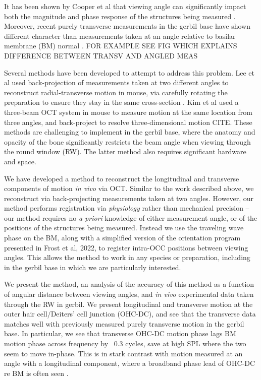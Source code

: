 \documentclass[preprint,NumberedRefs]{JASA}
\begin{document}
\par{It has been shown by Cooper et al that viewing angle can significantly impact both the magnitude and phase response of the structures being measured \citep{cooper2018}. Moreover, recent purely transverse measurements in the gerbil base have shown different character than measurements taken at an angle relative to basilar membrane (BM) normal \citep{Puria2022}. FOR EXAMPLE SEE FIG WHICH EXPLAINS DIFFERENCE BETWEEN TRANSV AND ANGLED MEAS}
\par{Several methods have been developed to attempt to address this problem. Lee et al used back-projection of measurements taken at two different angles to reconstruct radial-transverse motion in mouse, via carefully rotating the preparation to ensure they stay in the same cross-section \citep{lee}. Kim et al used a three-beam OCT system in mouse to measure motion at the same location from three angles, and back-project to resolve three-dimensional motion CITE. These methods are challenging to implement in the gerbil base, where the anatomy and opacity of the bone significantly restricts the beam angle when viewing through the round window (RW). The latter method also requires significant hardware and space.}
\par{We have developed a method to reconstruct the longitudinal and transverse components of motion \textit{in vivo} via OCT. Similar to the work described above, we reconstruct via back-projecting measurements taken at two angles. However, our method performs registration via \textit{physiology} rather than mechanical precision -- our method requires no \textit{a priori} knowledge of either measurement angle, or of the positions of the structures being measured. Instead we use the traveling wave phase on the BM, along with a simplified version of the orientation program presented in Frost et al, 2022, to register intra-OCC positions between viewing angles. This allows the method to work in any species or preparation, including in the gerbil base in which we are particularly interested.}
\par{We present the method, an analysis of the accuracy of this method as a function of angular distance between viewing angles, and \textit{in vivo} experimental data taken through the RW in gerbil. We present longitudinal and transverse motion at the outer hair cell/Deiters' cell junction (OHC-DC), and see that the transverse data matches well with previously measured purely transverse motion in the gerbil base. In particular, we see that transverse OHC-DC motion phase lags BM motion phase across frequency by ~0.3 cycles, save at high SPL where the two seem to move in-phase. This is in stark contrast with motion measured at an angle with a longitudinal component, where a broadband phase lead of OHC-DC re BM is often seen \citep{frost2022}.}
\end{document}

